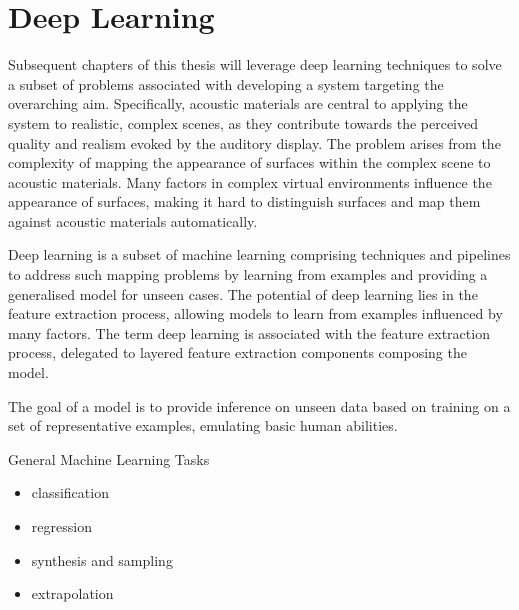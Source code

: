 
\section{Deep Learning}
Subsequent chapters of this thesis will leverage deep learning techniques to solve a subset of problems associated with developing a system targeting the overarching aim. Specifically, acoustic materials are central to applying the system to realistic, complex scenes, as they contribute towards the perceived quality and realism evoked by the auditory display. The problem arises from the complexity of mapping the appearance of surfaces within the complex scene to acoustic materials. Many factors in complex virtual environments influence the appearance of surfaces, making it hard to distinguish surfaces and map them against acoustic materials automatically.\par
Deep learning is a subset of machine learning comprising techniques and pipelines to address such mapping problems by learning from examples and providing a generalised model for unseen cases. The potential of deep learning lies in the feature extraction process, allowing models to learn from examples influenced by many factors. The term deep learning is associated with the feature extraction process, delegated to layered feature extraction components composing the model.\par
The goal of a model is to provide inference on unseen data based on training on a set of representative examples, emulating basic human abilities.

General Machine Learning Tasks

\cite{goodfellow2016deep}
\begin{itemize}
    \item classification
    \item regression
    \item synthesis and sampling
    \item extrapolation
\end{itemize}


